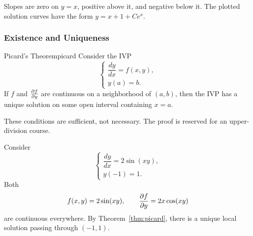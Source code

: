 \begin{example}[Slope Field for $y'=y-x$]
  Slopes are zero on $y=x$, positive above it, and negative below it.
  The plotted solution curves have the form $y=x+1+Ce^x$.
  \begin{center}
  \end{center}
\end{example}

\subsubsection{Existence and Uniqueness}

\begin{theorem}{Picard's Theorem}{picard}
  Consider the IVP
  \[
    \begin{cases}
      \dfrac{dy}{dx}=f(x,y), \\
      y(a)=b.
    \end{cases}
  \]
  If $f$ and $\frac{\partial f}{\partial y}$ are continuous on a neighborhood of $(a,b)$, then the IVP has a unique solution on some open interval containing $x=a$.
\end{theorem}

These conditions are sufficient, not necessary. The proof is reserved for an upper-division course.

\begin{example}
  Consider
  \[
    \begin{cases}
      \dfrac{dy}{dx}=2\sin(xy), \\
      y(-1)=1.
    \end{cases}
  \]
  Both
  \[
    f(x,y)=2\sin(xy),\qquad \frac{\partial f}{\partial y}=2x\cos(xy)
  \]
  are continuous everywhere. By Theorem~\ref{thm:picard}, there is a unique local solution passing through $(-1,1)$.
\end{example}

